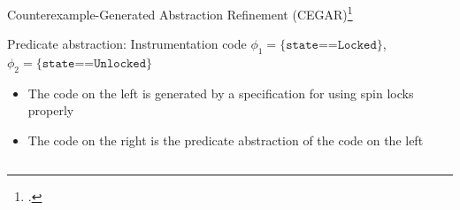 \documentclass[aspectratio=169]{beamer}
\begin{document}
\begin{frame}{Counterexample-Generated Abstraction Refinement (CEGAR)\footcite{clarke2003counterexample,ball2001automatic,ball2001automatically}}
  \small
  \begin{tightcenter}
  \end{tightcenter}
\end{frame}

\begin{frame}{Predicate abstraction: Instrumentation code}
  \begingroup\footnotesize
  $\phi_1 = \texttt{\{state==Locked\}}$, $\phi_2 = \texttt{\{state==Unlocked\}}$

  \begin{itemize}[<+->]
  \item The code on the left is generated by a specification for using
    spin locks properly
  \item The code on the right is the predicate abstraction of the code on the left
  \end{itemize}
  \endgroup
  
  \begin{columns}[t]
    \begin{column}{0.45\textwidth}
      
    \end{column}
    \begin{column}{0.45\textwidth}
      
    \end{column}
  \end{columns}
\end{frame}
\end{document}
